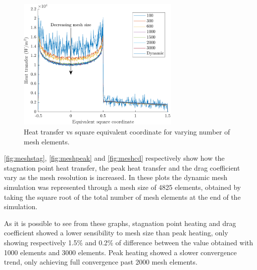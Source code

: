 \begin{figure}
    \centering
    \includegraphics[width=0.7\textwidth]{Images/3. Methodology/Mesh convergence/meshsec.pdf}
    \caption{Heat transfer vs square equivalent coordinate for varying number of mesh elements.}
    \label{fig:meshsec}
\end{figure}

\autoref{fig:meshstag}, \autoref{fig:meshpeak} and \autoref{fig:meshcd} respectively show how the stagnation point heat transfer, the peak heat transfer and the drag coefficient vary as the mesh resolution is increased. In these plots the dynamic mesh simulation was represented through a mesh size of 4825 elements, obtained by taking the square root of the total number of mesh elements at the end of the simulation.

As it is possible to see from these graphs, stagnation point heating and drag coefficient showed a lower sensibility to mesh size than peak heating, only showing respectively 1.5\% and 0.2\% of difference between the value obtained with 1000 elements and 3000 elements. Peak heating showed a slower convergence trend, only achieving full convergence past 2000 mesh elements.

